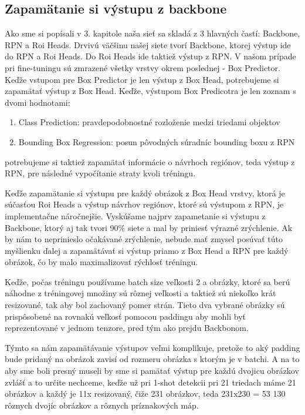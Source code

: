 \subsection{Zapamätanie si výstupu z backbone}

Ako sme si popísali v 3. kapitole naša sieť sa skladá z 3 hlavných častí: Backbone, RPN a Roi Heads. Drvivú väčšinu našej siete tvorí Backbone, ktorej výstup ide do RPN a Roi Heads. Do Roi Heads ide taktiež výstup z RPN. V našom prípade pri fine-tuningu sú zmrazené všetky vrstvy okrem poslednej - Box Predictor. Keďže vstupom pre Box Predictor je len výstup z Box Head, potrebujeme si zapamätať výstup z Box Head. Keďže, výstupom Box Predicotra je len zoznam s dvomi hodnotami:  

\begin{enumerate}
  \item Class Prediction: pravdepodobnostné rozloženie medzi triedami objektov
  \item Bounding Box Regression: posun pôvodných súradníc bounding boxu z RPN 
\end{enumerate}

potrebujeme si taktiež zapamätať informácie o návrhoch regiónov, teda výstup z RPN, pre následné vypočítanie straty kvoli tréningu.

Keďže zapamätanie si výstupu pre každý obrázok z Box Head vrstvy, ktorá je súčasťou Roi Heads a výstup návrhov regiónov, ktoré sú výstupom z RPN, je implementačne náročnejšie. Vyskúšame najprv zapametanie si výstupu z Backbone, ktorý aj tak tvori 90\% siete a mal by priniesť výrazné zrýchlenie. Ak by nám to neprinieslo očakávané zrýchlenie, nebude mať zmysel posúvať túto myšlienku ďalej a zapamätávať si výstup priamo z Box Head a RPN pre každý obrázok, čo by malo maximalizovať rýchlosť tréningu.

Keďže, počas tréningu používame batch size veľkosti 2 a obrázky, ktoré sa berú náhodne z tréningovej množiny sú rôznej veľkosti a taktiež sú niekoľko krát resizované, tak aby bol zachovaný pomer strán. Tieto dva vybrané obrázky sú prispôsobené na rovnakú veľkosť pomocou paddingu aby mohli byť reprezentované v jednom tenzore, pred tým ako prejdu Backbonom. 

Týmto sa nám zapamätávanie výstupov veľmi komplikuje, pretože to aký padding bude pridaný na obrázok zavisí od rozmeru obrázka s ktorým je v batchi. A na to aby sme boli presný museli by sme si pamätať výstup pre každú dvojicu obrázkov zvlášť a to určite nechceme, keďže už pri 1-shot detekcii pri 21 triedach máme 21 obrázkov a každý je 11x resizovaný, čiže 231 obrázkov, teda 231x230 = 53 130 rôznych dvojíc obrázkov a rôznych príznakových máp. 


